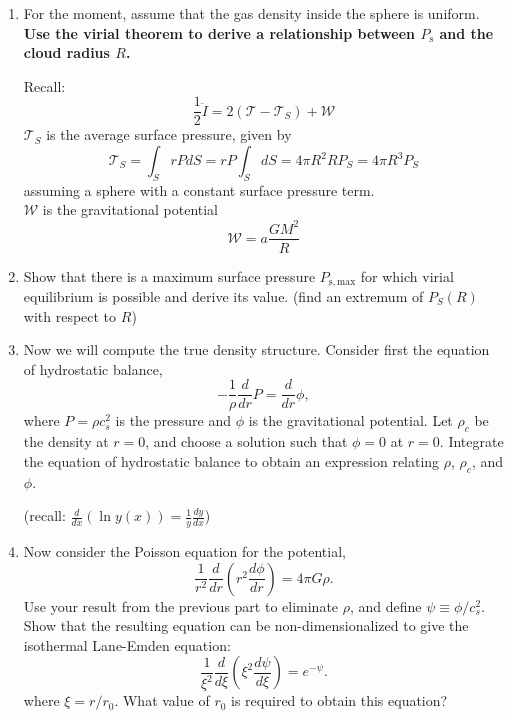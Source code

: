 \documentclass[twoside]{tufte-book} %
\begin{document}
\begin{enumerate}
\item For the moment, assume that the gas density inside the sphere is uniform.
    \textbf{Use the virial theorem to derive a relationship between $P_{\mathrm{s}}$
    and the cloud radius $R$. }

    Recall:
    $$\frac{1}{2}\ddot{I} = 2 (\mathcal{T} - \mathcal{T}_S) + \mathcal{W}$$
    $\mathcal{T}_S$ is the average surface pressure, given by
    $$\mathcal{T}_S = \int_S r P dS = r P \int_S dS = 4 \pi R^2 R P_S = 4 \pi R^3 P_S$$
    assuming a sphere with a constant surface pressure term. \\
    $\mathcal{W}$ is the gravitational potential
    $$\mathcal{W} = a \frac{GM^2}{R}$$

\item Show that there is a maximum surface pressure $P_{\mathrm{s,max}}$ for
    which virial equilibrium is possible and derive its value.
    (find an extremum of $P_S(R)$ with respect to $R$)


\item Now we will compute the true density structure. Consider first the equation of hydrostatic balance,
\begin{displaymath}
-\frac{1}{\rho}\frac{d}{dr} P = \frac{d}{dr} \phi,
\end{displaymath}
where $P = \rho c_s^2$ is the pressure and $\phi$ is the gravitational
potential. Let $\rho_c$ be the density at $r=0$, and choose a solution such that
$\phi = 0$ at $r=0$. Integrate the equation of hydrostatic balance to obtain an
expression relating $\rho$, $\rho_c$, and $\phi$.

(recall: $\frac{d }{dx}\left(\ln y(x)\right) = \frac{1}{y} \frac{d y}{dx}$)

\item Now consider the Poisson equation for the potential,
\begin{displaymath}
\frac{1}{r^2}\frac{d}{dr}\left(r^2 \frac{d\phi}{dr}\right) = 4 \pi G \rho.
\end{displaymath}
Use your result from the previous part to eliminate $\rho$, and define $\psi \equiv \phi/c_s^2$. Show that the resulting equation can be non-dimensionalized to give the isothermal Lane-Emden equation:
\begin{displaymath}
\frac{1}{\xi^2}\frac{d}{d\xi}\left(\xi^2 \frac{d\psi}{d\xi}\right) = e^{-\psi}.
\end{displaymath}
where $\xi = r/r_0$. What value of $r_0$ is required to obtain this equation?
\label{item:r0}



\end{enumerate}
\end{document}
